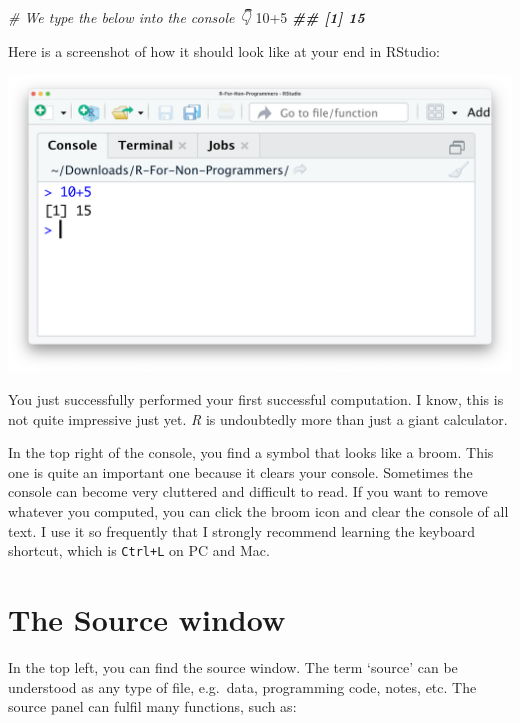 \documentclass[
]{book}
\newenvironment{Shaded}{\begin{snugshade}}{\end{snugshade}}
\newcommand{\CommentTok}[1]{\textcolor[rgb]{0.56,0.35,0.01}{\textit{#1}}}
\newcommand{\DecValTok}[1]{\textcolor[rgb]{0.00,0.00,0.81}{#1}}
\newcommand{\DocumentationTok}[1]{\textcolor[rgb]{0.56,0.35,0.01}{\textbf{\textit{#1}}}}
\newcommand{\SpecialCharTok}[1]{\textcolor[rgb]{0.00,0.00,0.00}{#1}}
\begin{document}
\begin{Shaded}
\begin{Highlighting}[]
\CommentTok{\# We type the below into the console 👇}
\DecValTok{10}\SpecialCharTok{+}\DecValTok{5}
\DocumentationTok{\#\# [1] 15}
\end{Highlighting}
\end{Shaded}

Here is a screenshot of how it should look like at your end in RStudio:

\includegraphics{images/chapter_04_img/02_console_window/console_algebra.png}

You just successfully performed your first successful computation. I know, this is not quite impressive just yet. \emph{R} is undoubtedly more than just a giant calculator.

In the top right of the console, you find a symbol that looks like a broom. This one is quite an important one because it clears your console. Sometimes the console can become very cluttered and difficult to read. If you want to remove whatever you computed, you can click the broom icon and clear the console of all text. I use it so frequently that I strongly recommend learning the keyboard shortcut, which is \texttt{Ctrl+L} on PC and Mac.

\hypertarget{the-source-window}{%
\section{The Source window}\label{the-source-window}}

In the top left, you can find the source window. The term `source' can be understood as any type of file, e.g.~data, programming code, notes, etc. The source panel can fulfil many functions, such as:
\end{document}
